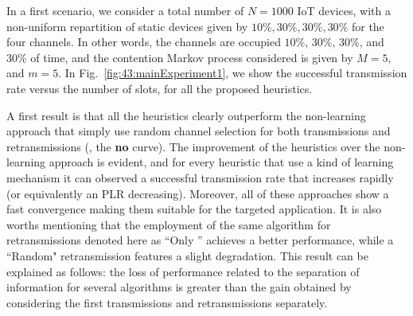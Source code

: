 In a first scenario, we consider a total number of $N=1000$ IoT devices, with a non-uniform repartition of static devices given by $10\%,30\%,30\%,30\%$ for the four channels.
In other words, the channels are occupied $10\%$, $30\%$, $30\%$, and $30\%$ of time, and the contention Markov process considered is given by $M = 5$, and $m=5$.
In Fig.~\ref{fig:43:mainExperiment1}, we show the successful transmission rate versus the number of slots, for all the proposed heuristics.

A first result is that all the heuristics clearly outperform the non-learning approach that simply use random channel selection for both transmissions and retransmissions (\ie, the \textbf{no \UCB{}} curve).
The improvement of the heuristics over the non-learning approach is evident, and for every heuristic that use a kind of learning mechanism it can observed a successful transmission rate that increases rapidly (or equivalently an PLR decreasing).
Moreover, all of these approaches show a fast convergence making them suitable for the targeted application.
It is also worths mentioning that the employment of the same \UCB{} algorithm for retransmissions denoted here as ``Only \UCB{}'' achieves a better performance, while a ``Random" retransmission features a slight degradation. This result can be explained as follows: the loss of performance related to the separation of information for several algorithms is greater than the gain obtained by considering the first transmissions and retransmissions separately.

